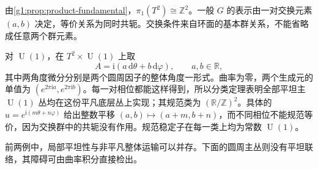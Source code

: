 \begin{example}\label{g1:exm:torus-principal-flat-moduli}
	由\cref{g1:prop:product-fundamental}，\(\pi_1(T^2)\cong\mathbb Z^2\)。一般 \(G\) 的表示由一对交换元素 \((a,b)\) 决定，等价关系为同时共轭。交换条件来自环面的基本群关系，不能省略成任意两个群元素。

	对 \(\operatorname{U}(1)\)，在 \(T^2\times\operatorname{U}(1)\) 上取
	\[
		A=\mathrm{i}(a\,\mathrm{d}\theta+b\,\mathrm{d}\varphi),\qquad a,b\in\mathbb R,
	\]
	其中两角度微分分别是两个圆周因子的整体角度一形式。曲率为零，两个生成元的单值为 \((e^{2\pi\mathrm{i}a},e^{2\pi\mathrm{i}b})\)。每一对相位都能这样得到，所以分类定理表明全部平坦主 \(\operatorname{U}(1)\) 丛均在这份平凡底层丛上实现；其规范类为 \((\mathbb R/\mathbb Z)^2\)。具体的 \(u=e^{\mathrm{i}(m\theta+n\varphi)}\) 给出整数平移 \((a,b)\mapsto(a+m,b+n)\)，而不同相位不能规范等价，因为交换群中的共轭没有作用。规范稳定子在每一类上均为常数 \(\operatorname{U}(1)\)。
\end{example}

前两例中，局部平坦性与非平凡整体运输可以并存。下面的圆周主丛则没有平坦联络，其障碍可由曲率积分直接检出。

